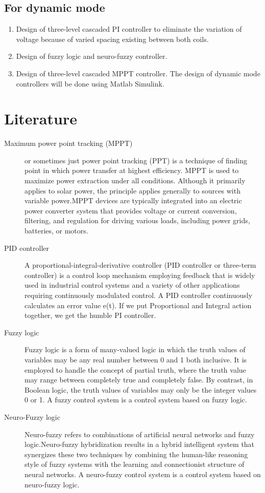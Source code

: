 \documentclass[12pt]{article}
\begin{document}
\subsection{For dynamic mode}
\begin{enumerate}
	\item Design of three-level cascaded PI controller  to eliminate the variation of voltage because of varied spacing existing between both coils.
	\item Design of fuzzy logic and neuro-fuzzy controller.
	\item Design of three-level cascaded MPPT controller. 
		The design of dynamic mode controllers will be done using Matlab Simulink. 
\end{enumerate}
\section{Literature}
\begin{description}
	\item[Maximum power point tracking (MPPT)] or sometimes just power point tracking (PPT) is a technique  of finding point in which power transfer at highest efficiency. MPPT is used  to maximize power extraction under all conditions. Although it primarily applies to solar power, the principle applies generally to sources with variable power.MPPT devices are typically integrated into an electric power converter system that provides voltage or current conversion, filtering, and regulation for driving various loads, including power grids, batteries, or motors.
	\item[PID controller] A proportional-integral-derivative controller (PID controller or three-term controller) is a control loop mechanism employing feedback that is widely used in industrial control systems and a variety of other applications requiring continuously modulated control. A PID controller continuously calculates an error value e(t). If we put Proportional and Integral action together, we get the humble PI controller.
	\item[Fuzzy logic] Fuzzy logic is a form of many-valued logic in which the truth values of variables may be any real number between 0 and 1 both inclusive. It is employed to handle the concept of partial truth, where the truth value may range between completely true and completely false. By contrast, in Boolean logic, the truth values of variables may only be the integer values 0 or 1. A fuzzy control system is a control system based on fuzzy logic.
	\item[Neuro-Fuzzy logic] Neuro-fuzzy refers to combinations of artificial neural networks and fuzzy logic.Neuro-fuzzy hybridization results in a hybrid intelligent system that synergizes these two techniques by combining the human-like reasoning style of fuzzy systems with the learning and connectionist structure of neural networks. A neuro-fuzzy control system is a control system based on neuro-fuzzy logic.
\end{description}
\end{document}
